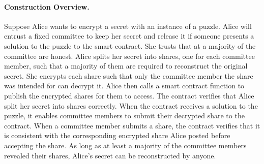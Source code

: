 \paragraph{Construction Overview.}
Suppose Alice wants to encrypt a secret with an instance of a puzzle.
Alice will entrust a fixed committee to keep her secret and release it if someone presents a solution to the puzzle to the smart contract.
She trusts that at a majority of the committee are honest.
Alice splits her secret into shares, one for each committee member, such that a majority of them are required to reconstruct the original secret.
She encrypts each share such that only the committee member the share was intended for can decrypt it.
Alice then calls a smart contract function to publish the encrypted shares for them to access.
The contract verifies that Alice split her secret into shares correctly.
When the contract receives a solution to the puzzle, it enables committee members to submit their decrypted share to the contract.
When a committee member submits a share, the contract verifies that it is consistent with the corresponding encrypted share Alice posted before accepting the share.
As long as at least a majority of the committee members revealed their shares, Alice's secret can be reconstructed by anyone.